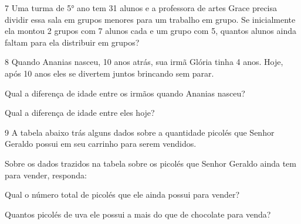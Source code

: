 {


\num{7} Uma turma de 5° ano tem 31 alunos e a professora de artes Grace
precisa dividir essa sala em grupos menores para um trabalho em grupo.
Se inicialmente ela montou 2 grupos com 7 alunos cada e um grupo com 5,
quantos alunos ainda faltam para ela distribuir em grupos?



\num{8} Quando Ananias nasceu, 10 anos atrás, sua irmã Glória tinha 4 anos.
Hoje, após 10 anos eles se divertem juntos brincando sem parar.

\begin{escolha}
\item
  Qual a diferença de idade entre os irmãos quando Ananias nasceu?


\item
  Qual a diferença de idade entre eles hoje?

\end{escolha}


\num{9} A tabela abaixo trás alguns dados sobre a quantidade picolés que
Senhor Geraldo possui em seu carrinho para serem vendidos.


Sobre os dados trazidos na tabela sobre os picolés que Senhor Geraldo
ainda tem para vender, responda:

\begin{escolha}
\item
  Qual o número total de picolés que ele ainda possui para vender?


\item
  Quantos picolés de uva ele possui a mais do que de chocolate para
  venda?


\end{escolha}}

